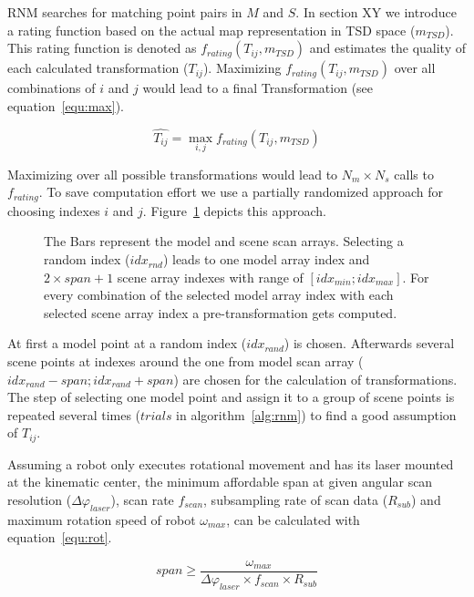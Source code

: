 \documentclass[conference]{IEEEtran}
\begin{document}
RNM searches for matching point pairs in $M$ and $S$. In section XY we introduce a rating function based on the actual map representation in TSD space ($m_{TSD}$). This rating function is denoted as $f_{rating}(T_{ij},m_{TSD})$ and estimates the quality of each calculated transformation ($T_{ij}$). Maximizing $f_{rating}(T_{ij},m_{TSD})$ over all combinations of $i$ and $j$ would lead to a final Transformation (see equation~\ref{equ:max}).

\begin{equation}
\label{equ:max}
\widehat{T_{ij}} = \max_{i,j} f_{rating}(T_{ij},m_{TSD})
\end{equation}

Maximizing over all possible transformations would lead to $N_m \times N_s$ calls to $f_{rating}$. To save computation effort we use a partially randomized approach for choosing indexes $i$ and $j$. Figure~\ref{fig:span} depicts this approach. 

\begin{figure}[htb] 
	\centering 
	\def\svgwidth{200pt} 
	\label{fig:span}
	 
	\caption{The Bars represent the model and scene scan arrays. Selecting a random index ($idx_{rnd}$) leads to one model array index and $2\times span + 1$ scene array indexes with range of $[idx_{min}; idx_{max}]$. For every combination of the selected model array index with each selected scene array index a pre-transformation gets computed.} 
\end{figure}

At first a model point at a random index ($idx_{rand}$) is chosen. Afterwards several scene points at indexes around the one from model scan array ($idx_{rand}-span; idx_{rand}+span$) are chosen for the calculation of transformations. The step of selecting one model point and assign it to a group of scene points is repeated several times ($trials$ in algorithm~\ref{alg:rnm}) to find a good assumption of $T_{ij}$. 

Assuming a robot only executes rotational movement and has its laser mounted at the kinematic center, the minimum affordable span at given angular scan resolution ($\Delta\varphi_{laser}$), scan rate $f_{scan}$, subsampling rate of scan data ($R_{sub}$) and maximum rotation speed of robot $\omega_{max}$, can be calculated with equation~\ref{equ:rot}.

\begin{equation}
\label{equ:rot}
span \geq \frac{\omega_{max}}{\Delta\varphi_{laser} \times f_{scan} \times R_{sub}}
\end{equation}
\end{document}
